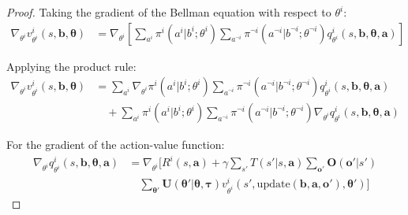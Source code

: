 \begin{proof}
    Taking the gradient of the Bellman equation with respect to $\theta^{i}$:
    \begin{align}
        \nabla_{\theta^i}v^{i}_{\theta^i}(s, \boldsymbol{b}, \boldsymbol{\theta}) & = \nabla_{\theta^i}\left[ \sum_{a^i}\pi^{i}(a^{i}|b^{i}; \theta^{i}) \sum_{a^{\neg i}}\pi^{\neg i}(a^{\neg i}|b^{\neg i}; \theta^{\neg i}) q^{i}_{\theta^i}(s, \boldsymbol{b}, \boldsymbol{\theta}, \boldsymbol{a}) \right]
    \end{align}

    Applying the product rule:
    \begin{align}
        \nabla_{\theta^i}v^{i}_{\theta^i}(s, \boldsymbol{b}, \boldsymbol{\theta}) & = \sum_{a^i}\nabla_{\theta^i}\pi^{i}(a^{i}|b^{i}; \theta^{i}) \sum_{a^{\neg i}}\pi^{\neg i}(a^{\neg i}|b^{\neg i}; \theta^{\neg i}) q^{i}_{\theta^i}(s, \boldsymbol{b}, \boldsymbol{\theta}, \boldsymbol{a}) \nonumber \\
                                                                                  & \quad + \sum_{a^i}\pi^{i}(a^{i}|b^{i}; \theta^{i}) \sum_{a^{\neg i}}\pi^{\neg i}(a^{\neg i}|b^{\neg i}; \theta^{\neg i}) \nabla_{\theta^i}q^{i}_{\theta^i}(s, \boldsymbol{b}, \boldsymbol{\theta}, \boldsymbol{a})
    \end{align}

    For the gradient of the action-value function:
    \begin{align}
        \nabla_{\theta^i}q^{i}_{\theta^i}(s, \boldsymbol{b}, \boldsymbol{\theta}, \boldsymbol{a}) & = \nabla_{\theta^i}\Bigg[ R^{i}(s, \boldsymbol{a}) + \gamma \sum_{s'}T(s'|s, \boldsymbol{a}) \sum_{\boldsymbol{o}'}\boldsymbol{O}(\boldsymbol{o}'|s') \nonumber                                                                \\
                                                                                                  & \quad \sum_{\boldsymbol{\theta}'}\boldsymbol{U}(\boldsymbol{\theta}'|\boldsymbol{\theta}, \boldsymbol{\tau}) v^{i}_{\theta^i}(s', \text{update}(\boldsymbol{b}, \boldsymbol{a}, \boldsymbol{o}'), \boldsymbol{\theta}') \Bigg]
    \end{align}


\end{proof}
